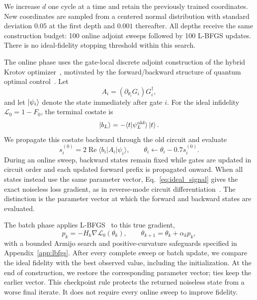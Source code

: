 We increase $d$ one cycle at a time and retain the previously trained coordinates. New coordinates are sampled from a centered normal distribution with standard deviation $0.05$ at the first depth and $0.001$ thereafter. All depths receive the same construction budget: 100 online adjoint sweeps followed by 100 L-BFGS updates. There is no ideal-fidelity stopping threshold within this search.

The online phase uses the gate-local discrete adjoint construction of the hybrid Krotov optimizer~\cite{Froehlich2026HybridKrotov}, motivated by the forward/backward structure of quantum optimal control~\cite{Goerz2019}. Let
\begin{equation}
    A_i=(\partial_{\theta_i}G_i)G_i^\dagger,
\end{equation}
and let $\ket{\psi_i}$ denote the state immediately after gate $i$. For the ideal infidelity $\mathcal L_0=1-F_0$, the terminal costate is
\begin{equation}
    \ket{b_L}=-\langle t|\psi_L^{\mathrm{old}}\rangle\ket{t}.
\end{equation}
We propagate this costate backward through the old circuit and evaluate
\begin{equation}
    s_i^{(0)}=2\operatorname{Re}\langle b_i|A_i|\psi_i\rangle,
    \qquad
    \theta_i\leftarrow\theta_i-0.7s_i^{(0)}.
    \label{eq:ideal_signal}
\end{equation}
During an online sweep, backward states remain fixed while gates are updated in circuit order and each updated forward prefix is propagated onward. When all states instead use the same parameter vector, Eq.~\eqref{eq:ideal_signal} gives the exact noiseless loss gradient, as in reverse-mode circuit differentiation~\cite{JonesGacon2020}. The distinction is the parameter vector at which the forward and backward states are evaluated.

The batch phase applies L-BFGS~\cite{LiuNocedal1989} to this true gradient,
\begin{equation}
    p_k=-H_k\nabla\mathcal L_0(\theta_k),\qquad
    \theta_{k+1}=\theta_k+\alpha_kp_k,
    \label{eq:lbfgs_direction}
\end{equation}
with a bounded Armijo search and positive-curvature safeguards specified in Appendix~\ref{app:lbfgs}. After every complete sweep or batch update, we compare the ideal fidelity with the best observed value, including the initialization. At the end of construction, we restore the corresponding parameter vector; ties keep the earlier vector. This checkpoint rule protects the returned noiseless state from a worse final iterate. It does not require every online sweep to improve fidelity.


